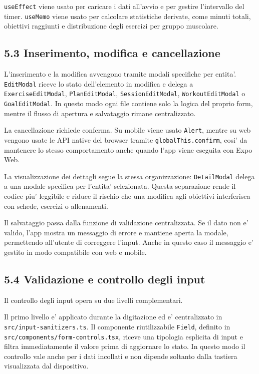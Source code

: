 \documentclass[11pt,a4paper]{article}
\begin{document}
\texttt{useEffect} viene usato per caricare i dati all'avvio e per gestire l'intervallo del timer. \texttt{useMemo} viene usato per calcolare statistiche derivate, come minuti totali, obiettivi raggiunti e distribuzione degli esercizi per gruppo muscolare.

\subsection{5.3 Inserimento, modifica e cancellazione}

L'inserimento e la modifica avvengono tramite modali specifiche per entita'. \texttt{EditModal} riceve lo stato dell'elemento in modifica e delega a \texttt{ExerciseEditModal}, \texttt{PlanEditModal}, \texttt{SessionEditModal}, \texttt{WorkoutEditModal} o \texttt{GoalEditModal}. In questo modo ogni file contiene solo la logica del proprio form, mentre il flusso di apertura e salvataggio rimane centralizzato.

La cancellazione richiede conferma. Su mobile viene usato \texttt{Alert}, mentre su web vengono usate le API native del browser tramite \texttt{globalThis.confirm}, cosi' da mantenere lo stesso comportamento anche quando l'app viene eseguita con Expo Web.

La visualizzazione dei dettagli segue la stessa organizzazione: \texttt{DetailModal} delega a una modale specifica per l'entita' selezionata. Questa separazione rende il codice piu' leggibile e riduce il rischio che una modifica agli obiettivi interferisca con schede, esercizi o allenamenti.

Il salvataggio passa dalla funzione di validazione centralizzata. Se il dato non e' valido, l'app mostra un messaggio di errore e mantiene aperta la modale, permettendo all'utente di correggere l'input. Anche in questo caso il messaggio e' gestito in modo compatibile con web e mobile.

\subsection{5.4 Validazione e controllo degli input}

Il controllo degli input opera su due livelli complementari.

Il primo livello e' applicato durante la digitazione ed e' centralizzato in \texttt{src/input-sanitizers.ts}. Il componente riutilizzabile \texttt{Field}, definito in \texttt{src/components/form-controls.tsx}, riceve una tipologia esplicita di input e filtra immediatamente il valore prima di aggiornare lo stato. In questo modo il controllo vale anche per i dati incollati e non dipende soltanto dalla tastiera visualizzata dal dispositivo.
\end{document}
